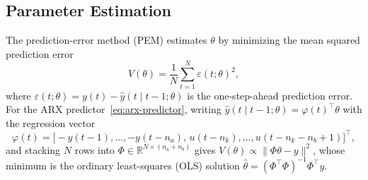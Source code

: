 \documentclass{ifacconf}
\begin{document}
\subsection{Parameter Estimation}
\label{subsec:criterion}

The prediction-error method (PEM) estimates $\theta$ by minimizing
the mean squared prediction error~\cite{ljung1999,soderstrom1989}
\begin{equation}
    V(\theta) = \frac{1}{N}\sum_{t=1}^{N} \varepsilon(t;\theta)^2,
    \label{eq:criterion}
\end{equation}
where $\varepsilon(t;\theta) = y(t) - \hat{y}(t \mid t-1;\theta)$ is the
one-step-ahead prediction error.
For the ARX predictor~\eqref{eq:arx-predictor}, writing
$\hat{y}(t \mid t-1;\theta) = \varphi(t)^\top\theta$ with the regression vector
\begin{equation}
  \varphi(t) = \bigl[-y(t-1),\ldots,-y(t-n_a),\,
                      u(t-n_k),\ldots,u(t-n_k-n_b+1)\bigr]^\top,
  \label{eq:regressor}
\end{equation}
and stacking $N$ rows into $\Phi \in \mathbb{R}^{N \times (n_a+n_b)}$ gives
$V(\theta) \propto \|\Phi\theta - y\|^2$,
whose minimum is the ordinary least-squares (OLS) solution
$\hat{\theta} = (\Phi^\top\Phi)^{-1}\Phi^\top y$.
\end{document}
